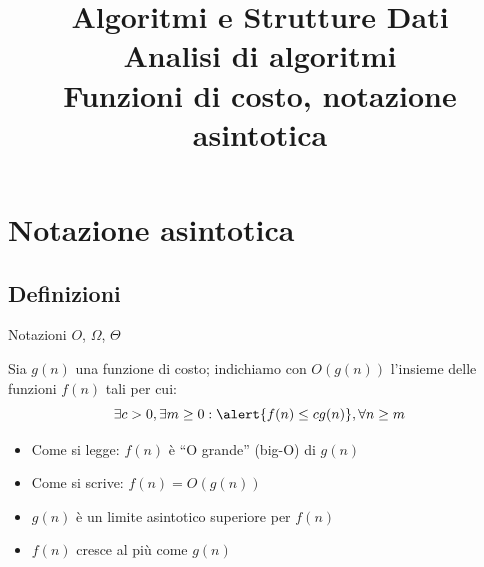 

\graphicspath{{figs/02/}}

\usepackage{cancel}
\usepackage{mleftright}

\def\arraystretch{1.1}

\newcommand*{\ballref}[1]{%
    \begin{pgfpicture}{-1ex}{-0.65ex}{1ex}{1ex}
    \usebeamercolor[fg]{item projected}
    {\pgftransformscale{1.75}\pgftext{\normalsize\pgfuseshading{bigsphere}}}
    {\pgftransformshift{\pgfpoint{0pt}{0.5pt}}
      \pgftext{\usebeamerfont*{item projected}\ref{#1}}}
  \end{pgfpicture}}%



\title[ASD - Analisi di algoritmi]{\textbf{Algoritmi e Strutture Dati}\\[18pt]Analisi di algoritmi\\Funzioni di costo, notazione asintotica}


\FrameTitle{}


\section{Notazione asintotica}

\subsection{Definizioni}

\begin{frame}{Notazioni $O$, $\Omega$, $\Theta$}

\vspace{-9pt}
\begin{myboxtitle}
Sia $g(n)$ una funzione di costo; indichiamo con $O(g(n))$ l'insieme
delle funzioni $f(n)$ tali per cui:\\[-6pt]
\[
  \exists c>0, \exists m \geq 0: \alert{f(n) \leq cg(n)}, \forall n \geq m
\]
\end{myboxtitle}

\medskip
\begin{itemize}
\item Come si legge: $f(n)$ è “\alert{O grande}” (big-O) di $g(n)$
\item Come si scrive: $f(n) = O(g(n))$
\item $g(n)$ è un \alert{limite asintotico superiore} per $f(n)$
\item $f(n)$ cresce al più come $g(n)$
\end{itemize}

\end{frame}

